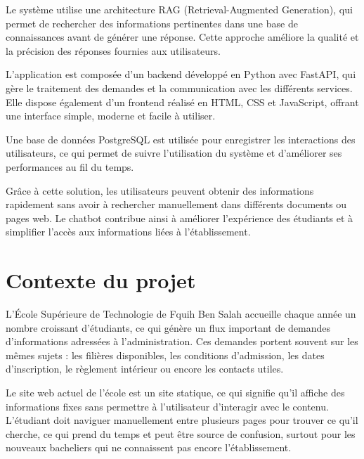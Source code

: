 \documentclass[12pt,a4paper]{report}
\begin{document}
Le système utilise une architecture RAG (Retrieval-Augmented Generation), qui \newline permet de rechercher des informations pertinentes dans une base de connaissances avant de générer une réponse. Cette approche améliore la qualité et la précision des réponses fournies aux utilisateurs.\newline

L’application est composée d’un backend développé en Python avec FastAPI, qui gère le traitement des demandes et la communication avec les différents services. Elle dispose également d’un frontend réalisé en HTML, CSS et JavaScript, offrant une interface simple, moderne et facile à utiliser.\newline

Une base de données PostgreSQL est utilisée pour enregistrer les interactions des \newline utilisateurs, ce qui permet de suivre l’utilisation du système et d’améliorer ses \newline performances au fil du temps.\newline

Grâce à cette solution, les utilisateurs peuvent obtenir des informations rapidement sans avoir à rechercher manuellement dans différents documents ou pages web. Le chatbot contribue ainsi à améliorer l’expérience des étudiants et à simplifier l’accès aux \newline informations liées à l’établissement. \newpage
\section{Contexte du projet}
L'École Supérieure de Technologie de Fquih Ben Salah accueille chaque année un nombre croissant d'étudiants, ce qui génère un flux important de demandes \newline d'informations adressées à l'administration. Ces demandes portent souvent sur les mêmes sujets : les filières disponibles, les conditions d'admission, les dates d'inscription, le \newline règlement intérieur ou encore les contacts utiles.
\newline

Le site web actuel de l'école est un site statique, ce qui signifie qu'il affiche des \newline informations fixes sans permettre à l'utilisateur d'interagir avec le contenu.
L'étudiant doit naviguer manuellement entre plusieurs pages pour trouver ce qu'il cherche, ce qui prend du temps et peut être source de confusion, surtout pour les nouveaux bacheliers qui ne connaissent pas encore l'établissement.
\newline
\end{document}
